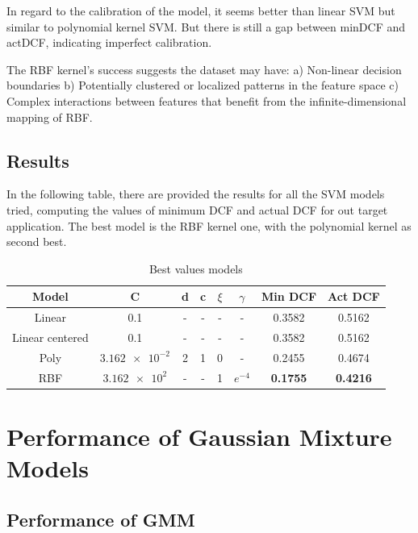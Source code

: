 \documentclass[12pt, a4paper]{article}
\begin{document}
In regard to the calibration of the model, it seems better than linear SVM but similar to polynomial kernel SVM. But there is still a gap between minDCF and actDCF, indicating imperfect calibration.

The RBF kernel's success suggests the dataset may have: a) Non-linear decision boundaries b) Potentially clustered or localized patterns in the feature space c) Complex interactions between features that benefit from the infinite-dimensional mapping of RBF.

\subsection{Results}
In the following table, there are provided the results for all the SVM models tried, computing the values of minimum DCF and actual DCF for out target application. The best model is the RBF kernel one, with the polynomial kernel as second best.

\begin{table}[ht!]
	\centering
 	\begin{tabular}{| | c c c c c c c c | |} 
 		\hline
 		Model & C & d & c & $\xi$ & $\gamma$ & Min DCF & Act DCF \\
 		\hline\hline
 		Linear & 0.1 & - & - & - & - & 0.3582 & 0.5162\\
 		\hline
 		Linear centered & 0.1 & - & - & - & - & 0.3582 & 0.5162\\
 		\hline
 		Poly & $\num{3.162e-2}$ & 2 & 1 & 0 & - & 0.2455 & 0.4674\\
 		\hline
 		RBF & $\num{3.162e2}$ & - & - & 1 & $e^{-4}$ & \textbf{0.1755} & \textbf{0.4216}\\
 		\hline
 	\end{tabular}
	\caption{Best values models}
\end{table}

\clearpage

\section{Performance of Gaussian Mixture Models}

\subsection{Performance of GMM}
\end{document}
